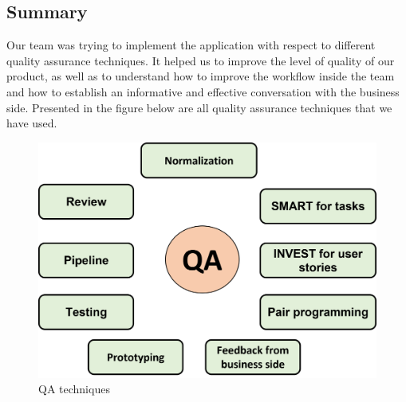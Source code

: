 \subsection{Summary}
Our team was trying to implement the application with respect to different quality assurance techniques. It helped us to improve the level of quality of our product, as well as to understand how to improve the workflow inside the team and how to establish an informative and effective conversation with the business side. Presented in the figure below are all quality assurance techniques that we have used.
\begin{figure}[h]
    \centering
    \includegraphics[scale=0.75]{resources/images/qa-techniques.png}
    \caption{QA techniques}
    \label{fig:qa-techniques}
\end{figure}